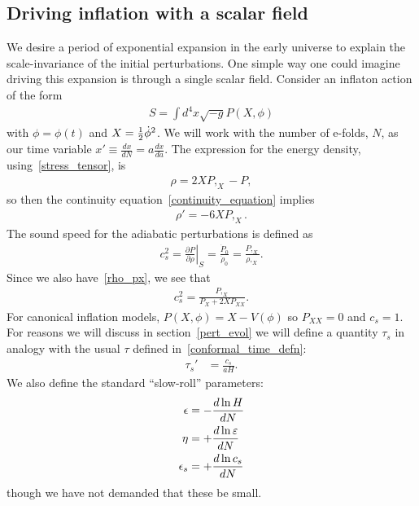     \subsection{Driving inflation with a scalar field}
    We desire a period of exponential expansion in the early universe to explain the
    scale-invariance of the initial perturbations.
    One simple way one could imagine driving this expansion is through a single
    scalar field.
Consider an inflaton action of the form
\begin{align}
S = \int d^4x \sqrt{-g}P(X,\phi)
\end{align}
with $\phi=\phi(t)$ and $X=\frac{1}{2}\dot{\phi}^2$.
We will work with the number of e-folds, $N$, as our time variable
$x'\equiv\frac{dx}{dN}=a\frac{dx}{da}$.
The expression for the energy density, using~\eqref{stress_tensor}, is
\begin{align}\label{rho_px}
    \rho = 2XP,_X-P,
\end{align}
so then the continuity equation~\eqref{continuity_equation} implies
\begin{align}\label{rho_deriv}
    \rho' = -6XP,_X.
\end{align}
    The sound speed for the adiabatic perturbations is defined as~\cite{Christopherson_2009}
    \begin{align}\label{sound_speed_definition}
        c_s^2 = \left. \frac{\partial P}{\partial \rho} \right|_S = \frac{\dot{P}_0}{\dot{\rho}_0}
        = \frac{P,_X}{\rho,_X}.
    \end{align}
    Since we also have~\eqref{rho_px}, we see that
    \begin{align}
        c_s^2 = \frac{P,_X}{P_X+2X P_{XX}}.
    \end{align}
    For canonical inflation models, $P(X,\phi)=X-V(\phi)$
    so $P_{XX}=0$ and $c_s=1$.
    For reasons we will discuss in section~\ref{pert_evol} we will
    define a quantity $\tau_s$
    in analogy with the usual $\tau$ defined in~\eqref{conformal_time_defn}:
    \begin{align}\label{tausdef}
        \tau_s'&=\frac{c_s}{aH}.
    \end{align}
We also define the standard ``slow-roll'' parameters:
\begin{align}\label{slowrollparams}
    \epsilon &= -\frac{d\ln H}{dN}	\\
    \eta &= +\frac{d\ln \varepsilon}{dN}\\
    \epsilon_s &= +\frac{d\ln c_s}{dN}
\end{align}
though we have not demanded that these be small.
